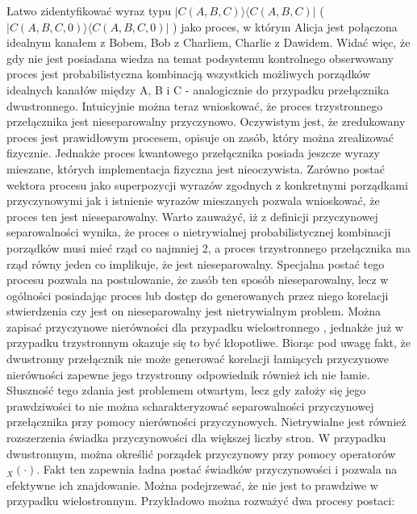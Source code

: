 \documentclass[10pt]{article} %
\newcommand{\Ket}[1]{|#1\rangle}
\newcommand{\Bra}[1]{\langle#1|}
\begin{document}
Łatwo zidentyfikować wyraz typu $\Ket{C(A,B,C)}\Bra{C(A,B,C)}$ ( $\Ket{C(A,B,C,0)}\Bra{C(A,B,C,0)}$ ) jako proces, w którym Alicja jest połączona idealnym kanałem z Bobem, Bob z Charliem, Charlie z Dawidem. Widać więc, że gdy nie jest posiadana wiedza na temat podsystemu kontrolnego obserwowany proces jest probabilistyczna kombinacją wszystkich możliwych porządków idealnych kanałów między A, B i C - analogicznie do przypadku przełącznika dwustronnego. Intuicyjnie można teraz wnioskować, że proces trzystronnego przełącznika jest nieseparowalny przyczynowo. Oczywistym jest, że zredukowany proces jest prawidłowym procesem, opisuje on zasób, który można zrealizować fizycznie. Jednakże proces kwantowego przełącznika posiada jeszcze wyrazy mieszane, których implementacja fizyczna jest nieoczywista. Zarówno postać wektora procesu jako superpozycji wyrazów zgodnych z konkretnymi porządkami przyczynowymi jak i istnienie wyrazów mieszanych pozwala wnioskować, że proces ten jest nieseparowalny. Warto zauważyć, iż z definicji przyczynowej separowalności wynika, że proces o nietrywialnej probabilistycznej kombinacji porządków musi mieć rząd co najmniej 2, a proces trzystronnego przełącznika ma rząd równy jeden co implikuje, że jest nieseparowalny. Specjalna postać tego procesu pozwala na postulowanie, że zasób ten sposób nieseparowalny, lecz w ogólności posiadając proces lub dostęp do generowanych przez niego korelacji stwierdzenia czy jest on nieseparowalny jest nietrywialnym problem. Można zapisać przyczynowe nierówności dla przypadku wielostronnego \cite{mp_ci}, jednakże już w przypadku trzystronnym okazuje się to być kłopotliwe.
Biorąc pod uwagę fakt, że dwustronny przełącznik nie może generować korelacji łamiących przyczynowe nierówności zapewne jego trzystronny odpowiednik również ich nie łamie. Słuszność tego zdania jest problemem otwartym, lecz gdy założy się jego prawdziwości to nie można scharakteryzować separowalności przyczynowej przełącznika przy pomocy nierówności przyczynowych. Nietrywialne jest również rozszerzenia świadka przyczynowości dla większej liczby stron. W przypadku dwustronnym, można określić porządek przyczynowy przy pomocy operatorów ${}_X(\cdot)$. Fakt ten zapewnia ładna postać świadków przyczynowości i pozwala na efektywne ich znajdowanie. Można podejrzewać, że nie jest to prawdziwe w przypadku wielostronnym. Przykładowo można rozważyć dwa procesy postaci:
\end{document}
